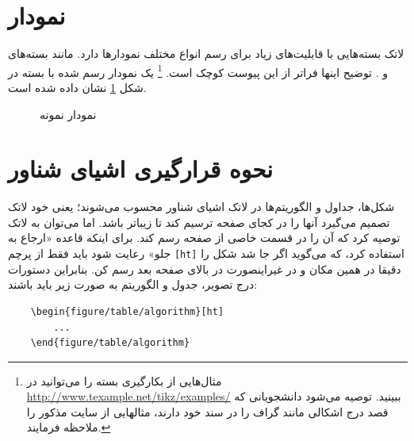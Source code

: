\section{نمودار}
لاتک بسته‌هایی با قابلیت‌های زیاد برای رسم انواع مختلف نمودارها دارد. مانند بسته‌های  و . توضیح اینها فراتر از این پیوست کوچک است.%
\footnote{
مثال‌هایی از بکارگیری بسته
را می‌توانید در
\url{http://www.texample.net/tikz/examples/}
ببینید. توصیه می‌شود دانشجویانی که قصد درج اشکالی مانند گراف را در سند خود دارند، مثالهایی از سایت مذکور را ملاحظه فرمایند.
}
یک نمودار رسم شده با بسته
 در شکل
\ref{fig:parabola}
نشان داده شده است.
\begin{figure}[t]
\centering
{}
\caption{نمودار نمونه}
\label{fig:parabola}
\end{figure}

\section{نحوه قرارگیری اشیای شناور}
\label{sec:floatObjs}
شکل‌ها، جداول و الگوریتم‌ها در لاتک اشیای شناور محسوب می‌شوند؛ یعنی خود لاتک تصمیم می‌گیرد آنها را در کجای صفحه ترسیم کند تا زیباتر باشد. اما می‌توان به لاتک توصیه کرد که آن را در قسمت خاصی از صفحه رسم کند. برای اینکه قاعده «ارجاع به جلو» رعایت شود باید فقط از پرچم
\verb|[ht]|
استفاده کرد، که می‌گوید اگر جا شد شکل را دقیقا در همین مکان و در غیراینصورت در بالای صفحه بعد رسم کن.
بنابراین دستورات درج تصویر، جدول و الگوریتم به صورت زیر باید باشند:

\begin{latin}
\begin{verbatim}
	\begin{figure/table/algorithm}[ht]
		...
	\end{figure/table/algorithm}
\end{verbatim}
\end{latin}
